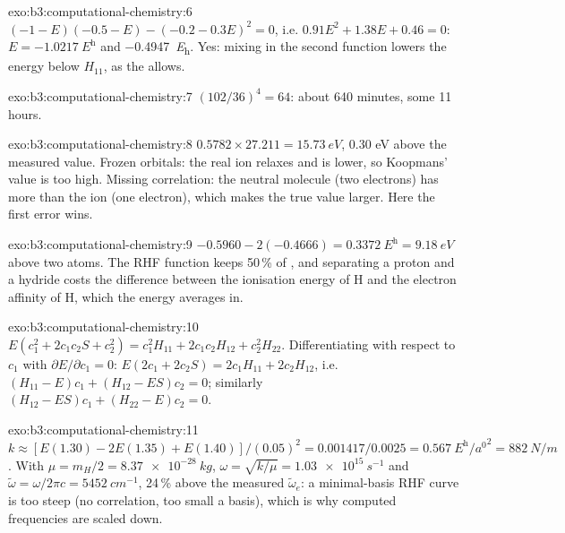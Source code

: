 \begin{solution}{exo:b3:computational-chemistry:6}
$(-1 - E)(-0.5 - E) - (-0.2 - 0.3E)^2 = 0$, i.e. $0.91E^2 + 1.38E + 0.46 = 0$:
$E = \qty{-1.0217}{\hartree}$ and \qty{-0.4947}{\hartree}. Yes: mixing in the
second function lowers the energy below $H_{11}$, as the 
allows.
\end{solution}

\begin{solution}{exo:b3:computational-chemistry:7}
$(102/36)^4 = 64$: about 640 minutes, some 11 hours.
\end{solution}

\begin{solution}{exo:b3:computational-chemistry:8}
$0.5782 \times 27.211 = \qty{15.73}{eV}$, 0.30 eV above the measured value. Frozen
orbitals: the real ion relaxes and is lower, so Koopmans' value is too high.
Missing correlation: the neutral molecule (two electrons) has more  than the ion (one electron), which makes the true value larger.
Here the first error wins.
\end{solution}

\begin{solution}{exo:b3:computational-chemistry:9}
$-0.5960 - 2(-0.4666) = \qty{0.3372}{\hartree} = \qty{9.18}{eV}$ above two atoms.
The RHF function keeps 50\,\% of , and separating a proton and a
hydride costs the difference between the ionisation energy of H and the
electron affinity of H, which the energy averages in.
\end{solution}

\begin{solution}{exo:b3:computational-chemistry:10}
$E(c_1^2 + 2c_1c_2S + c_2^2) = c_1^2H_{11} + 2c_1c_2H_{12} + c_2^2H_{22}$.
Differentiating with respect to $c_1$ with $\partial E/\partial c_1 = 0$:
$E(2c_1 + 2c_2S) = 2c_1H_{11} + 2c_2H_{12}$, i.e. $(H_{11} - E)c_1 + (H_{12} -
ES)c_2 = 0$; similarly $(H_{12} - ES)c_1 + (H_{22} - E)c_2 = 0$.
\end{solution}

\begin{solution}{exo:b3:computational-chemistry:11}
$k \approx [E(1.30) - 2E(1.35) + E(1.40)]/(0.05)^2 = 0.001417/0.0025 =
\qty{0.567}{\hartree\per\bohr\squared} = \qty{882}{N/m}$. With $\mu = m_H/2 =
\qty{8.37e-28}{kg}$, $\omega = \sqrt{k/\mu} = \qty{1.03e15}{s^{-1}}$ and
$\tilde\omega = \omega/2\pi c = \qty{5452}{cm^{-1}}$, 24\,\% above the measured
$\tilde\omega_e$: a minimal-basis RHF curve is too steep (no correlation, too
small a basis), which is why computed frequencies are scaled down.
\end{solution}

